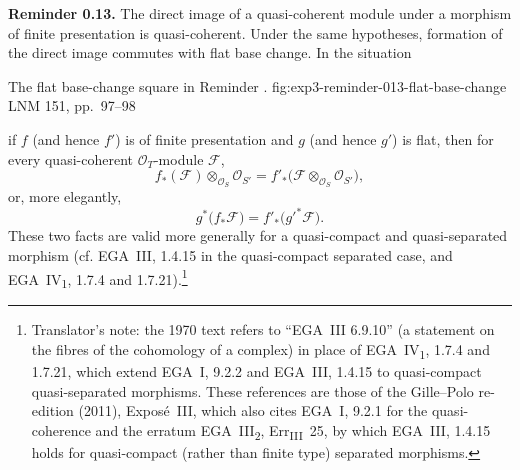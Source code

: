 \medskip
\noindent{}\textbf{Reminder 0.13.}
The direct image of a quasi-coherent module under a morphism of finite
presentation is quasi-coherent. Under the same hypotheses, formation of
the direct image commutes with flat base change. In the situation

  {The flat base-change square in Reminder .}
  {fig:exp3-reminder-013-flat-base-change}
  {LNM 151, pp.~97--98}

if \(f\) (and hence \(f'\)) is of finite presentation and \(g\) (and
hence \(g'\)) is flat, then for every quasi-coherent
\(\mathscr O_T\)-module \(\mathscr F\),
\[
 f_*(\mathscr F)\otimes_{\mathscr O_S}\mathscr O_{S'}
 =f'_*\bigl(\mathscr F\otimes_{\mathscr O_S}\mathscr O_{S'}\bigr),
\]
or, more elegantly,
\[
 g^*\bigl(f_*\mathscr F\bigr)=f'_*\bigl(g'^*\mathscr F\bigr).
\]
These two facts are valid more generally for a quasi-compact and
quasi-separated morphism (cf. EGA~III, 1.4.15 in the quasi-compact separated
case, and EGA~IV\textsubscript{1}, 1.7.4 and 1.7.21).\footnote{Translator's
note: the 1970 text refers to ``EGA~III 6.9.10'' (a statement on the fibres of
the cohomology of a complex) in place of EGA~IV\textsubscript{1}, 1.7.4 and
1.7.21, which extend EGA~I, 9.2.2 and EGA~III, 1.4.15 to quasi-compact
quasi-separated morphisms. These references are those of the Gille--Polo
re-edition (2011), Exposé~III, which also cites EGA~I, 9.2.1 for the
quasi-coherence and the erratum EGA~III\textsubscript{2},
Err\textsubscript{III}~25, by which EGA~III, 1.4.15 holds for quasi-compact
(rather than finite type) separated morphisms.}


